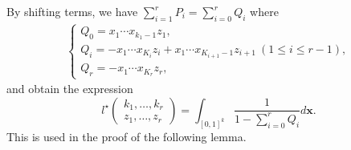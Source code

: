 \documentclass[12pt,a4paper]{article}
\theoremstyle{remark}
\begin{document}
By shifting terms, we have
$\sum_{i=1}^r P_i = \sum_{i=0}^rQ_i$ where
\begin{align*}
 \begin{cases}
    Q_0 =x_1\cdots x_{k_1-1}z_1,\\
    Q_i =-x_1\cdots x_{K_i}z_i +x_1\cdots x_{K_{i+1}-1}z_{i+1}
    \ (1\le i \le r-1),\\
    Q_r =-x_1\cdots x_{K_r}z_r,
 \end{cases}
\end{align*}
and obtain the expression
 \begin{equation*}
l^{\star}
 \begin{pmatrix}
 k_1, \ldots , k_r \\
 z_1, \ldots , z_r
 \end{pmatrix}
 = \displaystyle\int_{[0,1]^k}
 \dfrac{1}{1- \sum_{i=0}^r Q_i} d\boldsymbol{x}.
 \end{equation*}
This is used in the proof of the following lemma.
\end{document}
